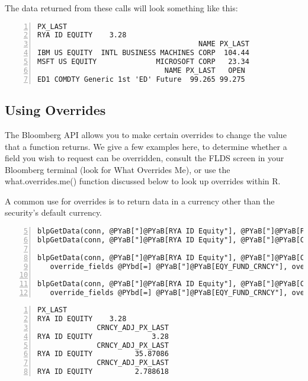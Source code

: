 \documentclass[a4paper]{article}
\begin{document}
    

The data returned from these calls will look something like this:

\begin{Verbatim}[commandchars=@\[\],numbers=left,firstnumber=1,stepnumber=1]
              PX_LAST
RYA ID EQUITY    3.28
                                      NAME PX_LAST
IBM US EQUITY  INTL BUSINESS MACHINES CORP  104.44
MSFT US EQUITY              MICROSOFT CORP   23.34
                              NAME PX_LAST   OPEN
ED1 COMDTY Generic 1st 'ED' Future  99.265 99.275
\end{Verbatim}

    


\subsection{Using Overrides} %
\label{sub:using_overrides}

The Bloomberg API allows you to make certain overrides to change the value that a function returns. We give a few examples here, to determine whether a field you wish to request can be overridden, consult the FLDS screen in your Bloomberg terminal (look for What Overrides Me), or use the what.overrides.me() function discussed below to look up overrides within R.

A common use for overrides is to return data in a currency other than the security's default currency.

\begin{Verbatim}[commandchars=@\[\],numbers=left,firstnumber=5,stepnumber=1]
blpGetData(conn, @PYaB["]@PYaB[RYA ID Equity"], @PYaB["]@PYaB[PX_LAST"])
blpGetData(conn, @PYaB["]@PYaB[RYA ID Equity"], @PYaB["]@PYaB[CRNCY_ADJ_PX_LAST"])

blpGetData(conn, @PYaB["]@PYaB[RYA ID Equity"], @PYaB["]@PYaB[CRNCY_ADJ_PX_LAST"], 
   override_fields @PYbd[=] @PYaB["]@PYaB[EQY_FUND_CRNCY"], overrides @PYbd[=] @PYaB["]@PYaB[HKD"])

blpGetData(conn, @PYaB["]@PYaB[RYA ID Equity"], @PYaB["]@PYaB[CRNCY_ADJ_PX_LAST"], 
   override_fields @PYbd[=] @PYaB["]@PYaB[EQY_FUND_CRNCY"], overrides @PYbd[=] @PYaB["]@PYaB[GBP"])
\end{Verbatim}

    

\begin{Verbatim}[commandchars=@\[\],numbers=left,firstnumber=1,stepnumber=1]
              PX_LAST
RYA ID EQUITY    3.28
              CRNCY_ADJ_PX_LAST
RYA ID EQUITY              3.28
              CRNCY_ADJ_PX_LAST
RYA ID EQUITY          35.87086
              CRNCY_ADJ_PX_LAST
RYA ID EQUITY          2.788618
\end{Verbatim}
\end{document}
